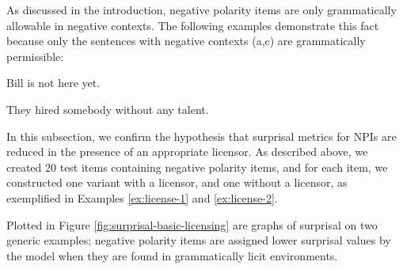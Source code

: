 \documentclass[11pt, round]{article}
\begin{document}
As discussed in the introduction, negative polarity items are only grammatically allowable in negative contexts. The following examples demonstrate this fact because only the sentences with negative contexts (a,c) are grammatically permissible:
\begin{exe}
\ex\label{ex:license-1}
\begin{xlist}
\ex Bill is not here yet.
\end{xlist}
\ex\label{ex:license-2}
\begin{xlist}
\ex They hired somebody without any talent.
\end{xlist}
\end{exe}
In this subsection, we confirm the hypothesis that surprisal metrics for NPIs are reduced in the presence of an appropriate licensor. As described above, we created 20 test items containing negative polarity items, and for each item, we constructed one variant with a licensor, and one without a licensor, as exemplified in Examples \ref{ex:license-1} and \ref{ex:license-2}.

Plotted in Figure \ref{fig:surprisal-basic-licensing} are graphs of surprisal on two generic examples; negative polarity items are assigned lower surprisal values by the model when they are found in grammatically licit environments. 
\end{document}
